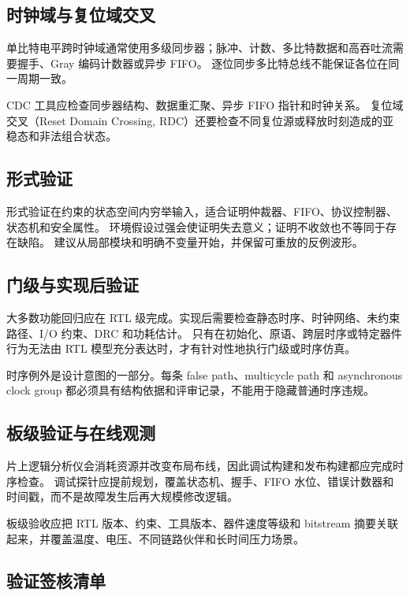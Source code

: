 \subsection{时钟域与复位域交叉}

单比特电平跨时钟域通常使用多级同步器；脉冲、计数、多比特数据和高吞吐流需要握手、Gray 编码计数器或异步 FIFO。
逐位同步多比特总线不能保证各位在同一周期一致。

CDC 工具应检查同步器结构、数据重汇聚、异步 FIFO 指针和时钟关系。
复位域交叉（Reset Domain Crossing, RDC）还要检查不同复位源或释放时刻造成的亚稳态和非法组合状态。

\subsection{形式验证}

形式验证在约束的状态空间内穷举输入，适合证明仲裁器、FIFO、协议控制器、状态机和安全属性。
环境假设过强会使证明失去意义；证明不收敛也不等同于存在缺陷。
建议从局部模块和明确不变量开始，并保留可重放的反例波形。

\subsection{门级与实现后验证}

大多数功能回归应在 RTL 级完成。实现后需要检查静态时序、时钟网络、未约束路径、I/O 约束、DRC 和功耗估计。
只有在初始化、原语、跨层时序或特定器件行为无法由 RTL 模型充分表达时，才有针对性地执行门级或时序仿真。

时序例外是设计意图的一部分。每条 false path、multicycle path 和 asynchronous clock group 都必须具有结构依据和评审记录，不能用于隐藏普通时序违规。

\subsection{板级验证与在线观测}

片上逻辑分析仪会消耗资源并改变布局布线，因此调试构建和发布构建都应完成时序检查。
调试探针应提前规划，覆盖状态机、握手、FIFO 水位、错误计数器和时间戳，而不是故障发生后再大规模修改逻辑。

板级验收应把 RTL 版本、约束、工具版本、器件速度等级和 bitstream 摘要关联起来，并覆盖温度、电压、不同链路伙伴和长时间压力场景。

\subsection{验证签核清单}

